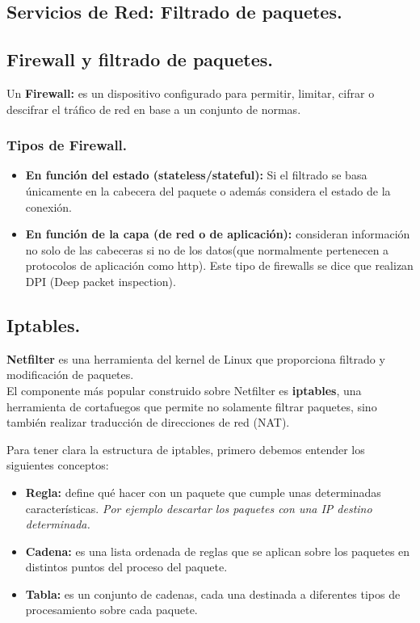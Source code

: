 \begin{onepage}


\section{Servicios de Red: Filtrado de paquetes.}
\subsection{Firewall y filtrado de paquetes.}
Un \textbf{Firewall:} es un dispositivo configurado para permitir, limitar, cifrar o descifrar el tráfico de red en base a un conjunto de normas.

\subsubsection{Tipos de Firewall.}
\begin{itemize}
    \item \textbf{En función del estado (stateless/stateful): }Si el filtrado se basa únicamente en la cabecera del paquete o además considera el estado de la conexión.
    \item \textbf{En función de la capa (de red o de aplicación):} consideran información no solo de las cabeceras si no de los datos(que normalmente pertenecen a protocolos de aplicación como http). Este tipo de firewalls se dice que realizan DPI (Deep packet inspection).
\end{itemize}

\subsection{Iptables.}
\textbf{Netfilter} es una herramienta del kernel de Linux que proporciona filtrado y modificación de paquetes.\\

El componente más popular construido sobre Netfilter es \textbf{iptables}, una herramienta de cortafuegos que permite no solamente filtrar paquetes, sino también realizar traducción de direcciones de red (NAT).\\
\begin{tcolorbox}[
colback=yellow!5!white,
colframe=yellow!75!cyan,
fonttitle=\bfseries]
Para tener clara la estructura de iptables, primero debemos entender los siguientes conceptos:
\begin{itemize}
    \item \textbf{Regla: }define qué hacer con un paquete que cumple unas determinadas características. \textit{Por ejemplo descartar los paquetes con una IP destino determinada.}
    \item \textbf{Cadena: }es una lista ordenada de reglas que se aplican sobre los paquetes en distintos puntos del proceso del paquete.
    \item \textbf{Tabla: }es un conjunto de cadenas, cada una destinada a diferentes tipos de procesamiento sobre cada paquete.
\end{itemize}
\end{tcolorbox}
\end{onepage}


